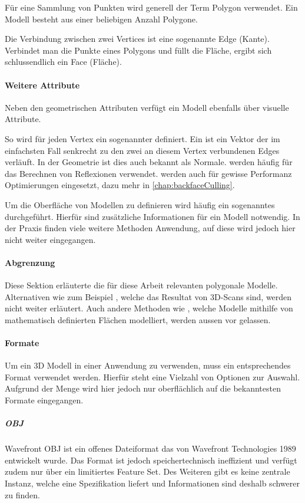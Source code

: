 Für eine Sammlung von Punkten wird generell der Term Polygon verwendet.
Ein Modell besteht aus einer beliebigen Anzahl Polygone.

Die Verbindung zwischen zwei Vertices ist eine sogenannte Edge (Kante).
Verbindet man die Punkte eines Polygons und füllt die Fläche, ergibt sich schlussendlich ein Face (Fläche).

\paragraph{Weitere Attribute}
Neben den geometrischen Attributen verfügt ein Modell ebenfalls über visuelle Attribute.

So wird für jeden Vertex ein sogenannter  definiert. Ein  ist ein Vektor der im einfachsten Fall senkrecht zu den zwei an diesem Vertex verbundenen Edges verläuft. In der Geometrie ist dies auch bekannt als Normale.  werden häufig für das Berechnen von Reflexionen verwendet.
 werden auch für gewisse Performanz Optimierungen eingesetzt, dazu mehr in \autoref{chap:backfaceCulling}.

Um die Oberfläche von Modellen zu definieren wird häufig ein sogenanntes  durchgeführt. Hierfür sind zusätzliche Informationen für ein Modell notwendig. In der Praxis finden viele weitere Methoden Anwendung, auf diese wird jedoch hier nicht weiter eingegangen.

\paragraph{Abgrenzung}
Diese Sektion erläuterte die für diese Arbeit relevanten polygonale Modelle. Alternativen wie zum Beispiel , welche das Resultat von 3D-Scans sind, werden nicht weiter erläutert. Auch andere Methoden wie , welche Modelle mithilfe von mathematisch definierten Flächen modelliert, werden aussen vor gelassen.

\paragraph{Formate}
Um ein 3D Modell in einer Anwendung zu verwenden, muss ein entsprechendes Format verwendet werden. Hierfür steht eine Vielzahl von Optionen zur Auswahl. Aufgrund der Menge wird hier jedoch nur oberflächlich auf die bekanntesten Formate eingegangen.

\subparagraph{OBJ}
Wavefront OBJ ist ein offenes Dateiformat das von Wavefront Technologies 1989 entwickelt wurde. Das Format ist jedoch speichertechnisch ineffizient und verfügt zudem nur über ein limitiertes Feature Set. Des Weiteren gibt es keine zentrale Instanz, welche eine Spezifikation liefert und Informationen sind deshalb schwerer zu finden. \cite{objSpec}

